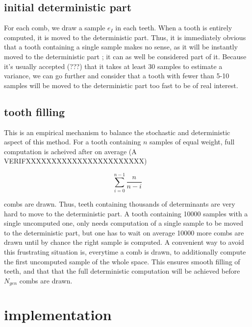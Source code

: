 \documentclass[./thesis.tex]{subfiles}
\begin{document}
\subsection*{initial deterministic part}

For each comb, we draw a sample $e_I$ in each teeth. When a tooth is entirely computed, it is moved to the deterministic part. Thus, it is immediately obvious that a tooth containing a single sample makes no sense, as it will be instantly moved to the deterministic part ; it can as well be considered part of it. Because it's usually accepted (???) that it takes at least 30 samples to estimate a variance, we can go further and consider that a tooth with fewer than 5-10 samples will be moved to the deterministic part too fast to be of real interest.


\subsection*{tooth filling}

This is an empirical mechanism to balance the stochastic and deterministic aspect of this method. For a tooth containing $n$ samples of equal weight, full computation is acheived after on average (A VERIFXXXXXXXXXXXXXXXXXXXXXXX)

\begin{equation}
\sum_{i=0}^{n-1} \frac{n}{n-i}
\end{equation}

combs are drawn. Thus, teeth containing thousands of determinants are very hard to move to the deterministic part. A tooth containing 10000 samples with a single uncomputed one, only needs computation of a single sample to be moved to the deterministic part, but one has to wait on average 10000 more combs are drawn until by chance the right sample is computed.
A convenient way to avoid this frustrating situation is, everytime a comb is drawn, to additionally compute the first uncomputed sample of the whole space. This ensures smooth filling of teeth, and that that the full deterministic computation will be achieved before $N_{gen}$ combs are drawn.

\section{implementation}
\end{document}
